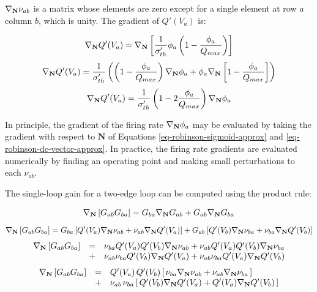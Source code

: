 $\nabla_{\mathbf{N}} \nu_{ab}$ is a matrix whose elements are zero except for a single
element at row $a$ column $b$, which is unity. The gradient of $Q'(V_a)$ is:

\begin{equation}
\nabla_{\mathbf{N}} Q'(V_a) = \nabla_{\mathbf{N}} \left [
\frac{1}{\sigma'_{th}} \phi_a \left ( 1 - \frac{\phi_a}{Q_{max}} \right )
\right ]
\end{equation}
%
\begin{equation}
\nabla_{\mathbf{N}} Q'(V_a) =
\frac{1}{\sigma'_{th}} \left (
\left ( 1 - \frac{\phi_a}{Q_{max}} \right ) \nabla_{\mathbf{N}} \phi_a
+ \phi_a \nabla_{\mathbf{N}} \left [ 1 - \frac{\phi_a}{Q_{max}} \right ]
\right )
\end{equation}
%
\begin{equation}
\nabla_{\mathbf{N}} Q'(V_a) = \frac{1}{\sigma'_{th}}
\left ( 1 - 2 \frac{\phi_a}{Q_{max}} \right ) \nabla_{\mathbf{N}} \phi_a
\label{eq-robinson-qprime-gradient}
\end{equation}

In principle, the gradient of the firing rate $\nabla_{\mathbf{N}} \phi_a$ may be
evaluated by taking the gradient with respect to $\mathbf{N}$ of Equations
\ref{eq-robinson-sigmoid-approx} and \ref{eq-robinson-dc-vector-approx}. In
practice, the firing rate gradients are evaluated numerically by finding an
operating point and making small perturbations to each $\nu_{ab}$.

The single-loop gain for a two-edge loop can be computed using the product
rule:

\begin{equation}
\nabla_{\mathbf{N}} \left [ G_{ab} G_{ba} \right ] =
G_{ba} \nabla_{\mathbf{N}} G_{ab} + G_{ab} \nabla_{\mathbf{N}} G_{ba}
\end{equation}
%
\begin{equation}
\nabla_{\mathbf{N}} \left [ G_{ab} G_{ba} \right ] =
G_{ba} \left [ Q'(V_a) \nabla_{\mathbf{N}} \nu_{ab} + \nu_{ab} \nabla_{\mathbf{N}} Q'(V_a) \right ]
+ G_{ab} \left [ Q'(V_b) \nabla_{\mathbf{N}} \nu_{ba} + \nu_{ba} \nabla_{\mathbf{N}} Q'(V_b) \right ]
\end{equation}
%
\begin{equation}
\begin{array}{rcl}
\nabla_{\mathbf{N}} \left [ G_{ab} G_{ba} \right ] & = &
\nu_{ba} Q'(V_a) Q'(V_b) \nabla_{\mathbf{N}} \nu_{ab}
+ \nu_{ab} Q'(V_a) Q'(V_b) \nabla_{\mathbf{N}} \nu_{ba} \\
 & + &
\nu_{ab} \nu_{ba} Q'(V_b) \nabla_{\mathbf{N}} Q'(V_a)
+ \nu_{ab} \nu_{ba} Q'(V_a) \nabla_{\mathbf{N}} Q'(V_b) \\
\end{array}
\end{equation}
%
\begin{equation}
\begin{array}{rcl}
\nabla_{\mathbf{N}} \left [ G_{ab} G_{ba} \right ] & = &
Q'(V_a) \, Q'(V_b)
\left [ \, \nu_{ba} \nabla_{\mathbf{N}} \nu_{ab} + \nu_{ab} \nabla_{\mathbf{N}} \nu_{ba} \, \right ] \\
 & + &
\nu_{ab} \, \nu_{ba}
\left [ \, Q'(V_b) \nabla_{\mathbf{N}} Q'(V_a) + Q'(V_a) \nabla_{\mathbf{N}} Q'(V_b) \, \right ] \\
\end{array}
\label{eq-robinson-loop2-gain-gradient}
\end{equation}



%
%

